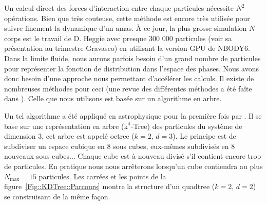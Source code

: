 			Un calcul direct des forces d'interaction entre chaque particules nécessite $N^2$ opérations.
			Bien que très couteuse, cette méthode est encore très utilisée pour suivre finement la dynamique
			d'un amas. À ce jour, la plus grosse simulation $N$-corps est le travail de D. Heggie avec
			presque 300 000 particules (voir sa présentation au trimestre Gravasco) en utilisant la version
			GPU de NBODY6. Dans la limite fluide, nous aurons parfois besoin d'un grand nombre de particules
			pour représenter la fonction de distribution dans l'espace des phases. Nous avons donc besoin
			d'une approche nous permettant d'accélérer les calculs. Il existe de nombreuses méthodes pour
			ceci (une revue des différentes méthodes a été faîte dans \citet{2014arXiv1404.5175C}). Celle
			que nous utilisons est basée sur un algorithme en arbre.


			Un tel algorithme a été appliqué en astrophysique pour la première fois par
			\cite{1986Natur.324..446B}. Il se base sur une représentation en arbre
			($\mathrm{k}^\mathrm{d}$-Tree) des particules du système de dimension 3, cet arbre est appelé
			octree ($k=2$, $d=3$). Le principe est de subdiviser un espace cubique en 8 sous cubes, eux-mêmes subdivisés en
			8 nouveaux sous cubes... Chaque cube est à nouveau divisé s'il contient encore trop de
			particules.
			En pratique nous nous arrêterons lorsqu'un cube contiendra au plus $N_\mathrm{max}=15$ particules.
			Les carrées et les points de la figure~\ref{Fig::KDTree::Parcours} montre la structure d'un
			quadtree ($k=2$, $d=2$) se construisant de la même façon.

